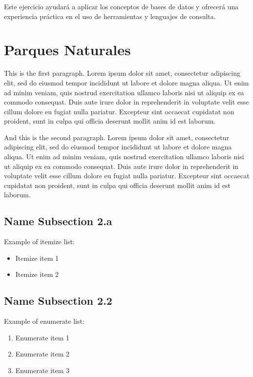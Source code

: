 \documentclass{article}
\begin{document}
Este ejercicio ayudará a aplicar los conceptos de bases de datos y ofrecerá una experiencia práctica en el uso de herramientas y lenguajes de consulta.



\section{Parques Naturales}

This is the first paragraph. Lorem ipsum dolor sit amet, consectetur adipiscing elit, sed do eiusmod tempor incididunt ut labore et dolore magna aliqua. Ut enim ad minim veniam, quis nostrud exercitation ullamco laboris nisi ut aliquip ex ea commodo consequat. Duis aute irure dolor in reprehenderit in voluptate velit esse cillum dolore eu fugiat nulla pariatur. Excepteur sint occaecat cupidatat non proident, sunt in culpa qui officia deserunt mollit anim id est laborum.

And this is the second paragraph. Lorem ipsum dolor sit amet, consectetur adipiscing elit, sed do eiusmod tempor incididunt ut labore et dolore magna aliqua. Ut enim ad minim veniam, quis nostrud exercitation ullamco laboris nisi ut aliquip ex ea commodo consequat. Duis aute irure dolor in reprehenderit in voluptate velit esse cillum dolore eu fugiat nulla pariatur. Excepteur sint occaecat cupidatat non proident, sunt in culpa qui officia deserunt mollit anim id est laborum.



\subsection{Name Subsection 2.a}

Example of itemize list:


\begin{itemize}
  \item Itemize item 1
  \item Itemize item 2
\end{itemize}



\subsection{Name Subsection 2.2}

Example of enumerate list:

\begin{enumerate}
  \item Enumerate item 1
  \item Enumerate item 2
  \item Enumerate item 3
\end{enumerate}
\end{document}
